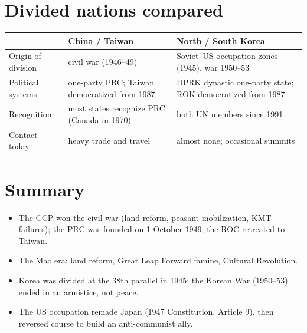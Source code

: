 \section{Divided nations compared}

\begin{center}
\begin{tabular}{lp{5.5cm}p{5.5cm}}
\toprule
 & China / Taiwan & North / South Korea \\
\midrule
Origin of division & civil war (1946--49) & Soviet--US occupation zones (1945), war 1950--53 \\
Political systems & one-party PRC; Taiwan democratized from 1987 & DPRK dynastic one-party state; ROK democratized from 1987 \\
Recognition & most states recognize PRC (Canada in 1970) & both UN members since 1991 \\
Contact today & heavy trade and travel & almost none; occasional summits \\
\bottomrule
\end{tabular}
\end{center}

\section*{Summary}
\begin{itemize}
  \item The CCP won the civil war (land reform, peasant mobilization, KMT failures); the PRC
        was founded on 1 October 1949; the ROC retreated to Taiwan.
  \item The Mao era: land reform, Great Leap Forward famine, Cultural Revolution.
  \item Korea was divided at the 38th parallel in 1945; the Korean War (1950--53) ended in
        an armistice, not peace.
  \item The US occupation remade Japan (1947 Constitution, Article 9), then reversed course
        to build an anti-communist ally.
\end{itemize}
